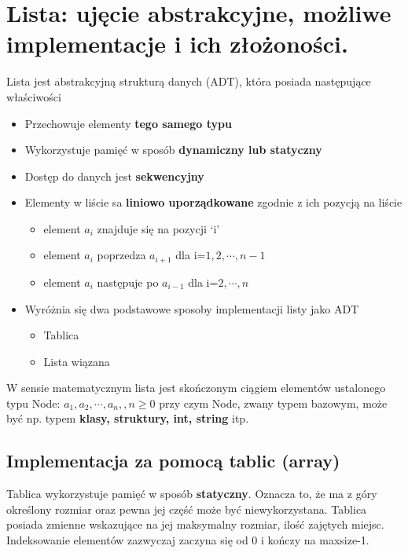 \documentclass[main.tex]{subfiles}
\begin{document}
    \section{Lista: ujęcie abstrakcyjne, możliwe implementacje i ich złożoności.}
    \begin{definition}
        Lista jest abstrakcyjną strukturą danych (ADT), która posiada następujące właściwości
        \begin{itemize}
            \item Przechowuje elementy \textbf{tego samego typu}
            \item Wykorzystuje pamięć w sposób \textbf{dynamiczny lub statyczny}
            \item Dostęp do danych jest \textbf{sekwencyjny}
            \item Elementy w liście sa \textbf{liniowo uporządkowane} zgodnie z ich pozycją na liście
            \begin{itemize}
                \item element $a_i$ znajduje się na pozycji ‘i’
                \item element $a_i$ poprzedza $a_{i+1}$ dla i=$1,2,\cdots,n-1$
                \item element $a_i$ następuje po $a_{i-1}$ dla i=$2,\cdots,n$
            \end{itemize}
            \item Wyróżnia się dwa podstawowe sposoby implementacji listy jako ADT
            \begin{itemize}
                \item Tablica
                \item Lista wiązana
            \end{itemize}
        \end{itemize}
    \end{definition}

    \begin{definition}
        W sensie matematycznym lista jest skończonym ciągiem elementów ustalonego typu
        Node: $a_1, a_2, \cdots , a_n, , n \geq 0$
        przy czym Node, zwany typem bazowym, może być np. typem \textbf{klasy, struktury, int,
        string} itp.
    \end{definition}

    \subsection{Implementacja za pomocą tablic (array)}
    Tablica wykorzystuje pamięć w sposób \textbf{statyczny}. Oznacza to, że ma z góry określony rozmiar oraz pewna jej część może być niewykorzystana. Tablica posiada zmienne wskazujące na jej maksymalny rozmiar, ilość zajętych miejsc. Indeksowanie elementów zazwyczaj zaczyna się od 0 i kończy na maxsize-1.
\end{document}
